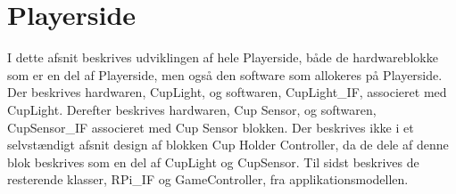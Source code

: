 \documentclass[Rapport/Rapport_main.tex]{subfiles}
\begin{document}
\section{Playerside}
I dette afsnit beskrives udviklingen af hele Playerside, både de hardwareblokke som er en del af Playerside, men også den software som allokeres på Playerside. Der beskrives hardwaren, CupLight, og softwaren, CupLight\_IF, associeret med CupLight. Derefter beskrives hardwaren, Cup Sensor, og softwaren, CupSensor\_IF associeret med Cup Sensor blokken. Der beskrives ikke i et selvstændigt afsnit design af blokken Cup Holder Controller, da de dele af denne blok beskrives som en del af CupLight og CupSensor.
Til sidst beskrives de resterende klasser, RPi\_IF og GameController, fra applikationsmodellen.





\end{document}
